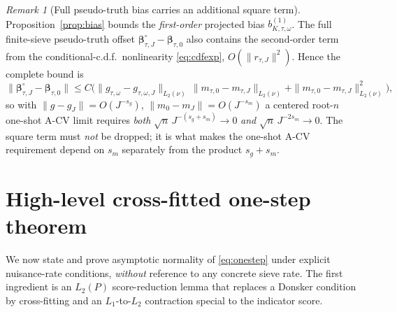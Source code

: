 \documentclass[11pt]{article}
\theoremstyle{remark}\newtheorem{remark}{Remark}
\newcommand{\bbeta}{\bm{\beta}}
\begin{document}
\begin{remark}[Full pseudo-truth bias carries an additional square term]
\label{rem:square}
Proposition~\ref{prop:bias} bounds the \emph{first-order} projected bias
$b_{K,\tau,\omega}^{(1)}$. The full finite-sieve pseudo-truth offset
$\bbeta_{\tau,J}^\circ-\bbeta_{\tau,0}$ also contains the second-order term from
the conditional-c.d.f.\ nonlinearity \eqref{eq:cdfexp}, $O(\|r_{\tau,J}\|^2)$.
Hence the complete bound is
\[
\|\bbeta_{\tau,J}^\circ-\bbeta_{\tau,0}\|\le
C\big(\|g_{\tau,\omega}-g_{\tau,\omega,J}\|_{L_2(\nu)}\,
\|m_{\tau,0}-m_{\tau,J}\|_{L_2(\nu)}+\|m_{\tau,0}-m_{\tau,J}\|_{L_2(\nu)}^2\big),
\]
so with $\|g-g_J\|=O(J^{-s_g})$, $\|m_0-m_J\|=O(J^{-s_m})$ a centered root-$n$
one-shot A-CV limit requires \emph{both} $\sqrt n\,J^{-(s_g+s_m)}\to0$ \emph{and}
$\sqrt n\,J^{-2s_m}\to0$. The square term must \emph{not} be dropped; it is what
makes the one-shot A-CV requirement depend on $s_m$ separately from the product
$s_g+s_m$.
\end{remark}

\section{High-level cross-fitted one-step theorem}\label{sec:onestep}
We now state and prove asymptotic normality of \eqref{eq:onestep} under explicit
nuisance-rate conditions, \emph{without} reference to any concrete sieve rate.
The first ingredient is an $L_2(P)$ score-reduction lemma that replaces a
Donsker condition by cross-fitting and an $L_1$-to-$L_2$ contraction special to
the indicator score.
\end{document}
